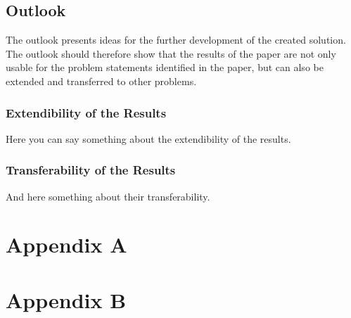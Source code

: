 \documentclass[oneside]{ausarbeitung}
\begin{document}
\section{Outlook}
\label{sec:ausblick}

The outlook presents ideas for the further development of the created solution.
The outlook should therefore show that the results of the
paper are not only usable for the problem statements identified in the paper,
but can also be extended and transferred to other
problems.

\subsection{Extendibility of the Results}
\label{sub:erweiterbarkeit}

Here you can say something about the extendibility of the results.

\subsection{Transferability of the Results}
\label{sub:uebertragbarkeit}

And here something about their transferability.

\appendix

\printbibliography[heading=bibintoc]

\chapter{Appendix A}

\Blindtext
\Blindtext

\chapter{Appendix B}

\Blindtext
\end{document}
